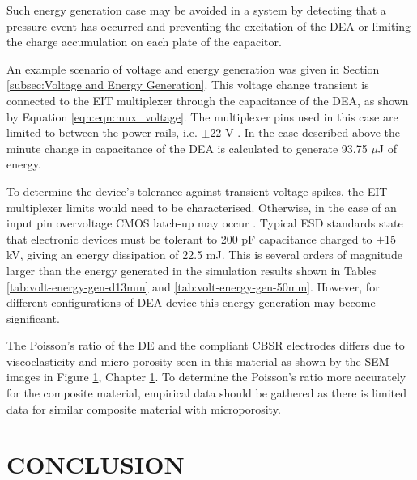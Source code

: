 Such energy generation case may be avoided in a system by detecting that a pressure event has occurred and preventing the excitation of the DEA or limiting the charge accumulation on each plate of the capacitor.

An example scenario of voltage and energy generation was given in Section \ref{subsec:Voltage and Energy Generation}. This voltage change transient is connected to the EIT multiplexer through the capacitance of the DEA, as shown by Equation \ref{eqn:eqn:mux_voltage}. The multiplexer pins used in this case are limited to between the power rails, i.e. $\pm$22 V \cite{VishayPG2018}. In the case described above the minute change in capacitance of the DEA is calculated to generate 93.75 $\mu$J of energy.

To determine the device's tolerance against transient voltage spikes, the EIT multiplexer limits would need to be characterised. Otherwise, in the case of an input pin overvoltage CMOS latch-up may occur \cite{Redmond2001} . Typical ESD standards \cite{IEC2008} state that electronic devices must be tolerant to 200 pF capacitance charged to $\pm$15 kV, giving an energy dissipation of 22.5 mJ. This is several orders of magnitude larger than the energy generated in the simulation results shown in Tables \ref{tab:volt-energy-gen-d13mm} and \ref{tab:volt-energy-gen-50mm}. However, for different configurations of DEA device this energy generation may become significant.

The Poisson's ratio of the DE and the compliant CBSR electrodes differs due to viscoelasticity and micro-porosity seen in this material as shown by the SEM images in Figure \ref{}, Chapter \ref{}. To determine the Poisson's ratio more accurately for the composite material, empirical data should be gathered as there is limited data for similar composite material with microporosity.  %


\section{CONCLUSION}

